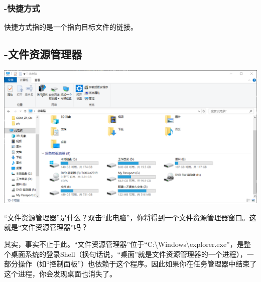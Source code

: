 \subsubsection{-快捷方式}
快捷方式指的是一个指向目标文件的链接。
\subsection{-文件资源管理器}
\label{Sec:FE}
\begin{center}
	\includegraphics[scale=0.3]{pic/explorer}
\end{center} \par
“文件资源管理器”是什么？双击“此电脑”，你将得到一个文件资源管理器窗口。这就是“文件资源管理器”吗？\par
其实，事实不止于此。“文件资源管理器”位于“C:\textbackslash Windows\textbackslash explorer.exe”，是整个桌面系统的登录Shell（换句话说，“桌面”就是文件资源管理器的一个进程），一部分操作（如“控制面板”）也依赖于这个程序。因此如果你在任务管理器中结束了这个进程，你会发现桌面也消失了。\par
